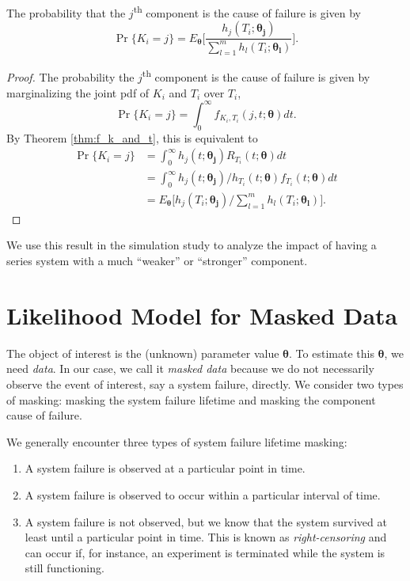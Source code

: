 \documentclass[
]{article}
\providecommand{\tightlist}{%
  \setlength{\itemsep}{0pt}\setlength{\parskip}{0pt}}
\begin{document}
The probability that the \(j\)\textsuperscript{th} component is the
cause of failure is given by \begin{equation}
\label{eq:prob_k}
\Pr\{K_i = j\} = E_{\boldsymbol{\theta}}
\biggl[
    \frac{h_j(T_i;\boldsymbol{\theta_j})}
         {\sum_{l=1}^m h_l(T_i ; \boldsymbol{\theta_l})}
\biggr].
\end{equation}

\begin{proof}
The probability the $j$\textsuperscript{th} component is the cause of failure is given by
marginalizing the joint pdf of $K_i$ and $T_i$ over $T_i$,
$$
\Pr\{K_i = j\} = \int_0^{\infty} f_{K_i,T_i}(j,t;\boldsymbol{\theta}) dt.
$$
By Theorem \ref{thm:f_k_and_t}, this is equivalent to
\begin{align*}
\Pr\{K_i = j\}
    &= \int_0^{\infty} h_j(t;\boldsymbol{\theta_j}) R_{T_i}(t;\boldsymbol{\theta}) dt\\
    &= \int_0^{\infty} h_j(t;\boldsymbol{\theta_j}) / h_{T_i}(t ; \boldsymbol{\theta}) f_{T_i}(t ; \boldsymbol{\theta})dt\\
    &= E_{\boldsymbol{\theta}}\bigl[h_j(T_i;\boldsymbol{\theta_j}) / \sum_{l=1}^m h_l(T_i ; \boldsymbol{\theta_l})\bigr].
\end{align*}
\end{proof}

We use this result in the simulation study to analyze the impact of
having a series system with a much ``weaker'' or ``stronger'' component.

\hypertarget{sec:like_model}{%
\section{Likelihood Model for Masked Data}\label{sec:like_model}}

The object of interest is the (unknown) parameter value
\(\boldsymbol{\theta}\). To estimate this \(\boldsymbol{\theta}\), we
need \emph{data}. In our case, we call it \emph{masked data} because we
do not necessarily observe the event of interest, say a system failure,
directly. We consider two types of masking: masking the system failure
lifetime and masking the component cause of failure.

We generally encounter three types of system failure lifetime masking:

\begin{enumerate}
\def\labelenumi{\arabic{enumi}.}
\tightlist
\item
  A system failure is observed at a particular point in time.
\item
  A system failure is observed to occur within a particular interval of
  time.
\item
  A system failure is not observed, but we know that the system survived
  at least until a particular point in time. This is known as
  \emph{right-censoring} and can occur if, for instance, an experiment
  is terminated while the system is still functioning.
\end{enumerate}
\end{document}
